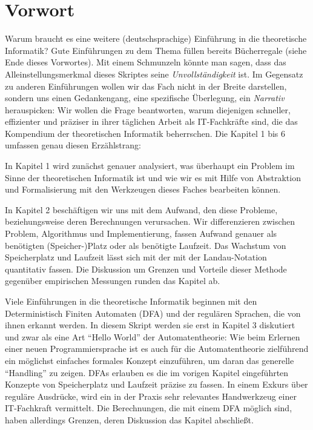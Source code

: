 \chapter{Vorwort}

Warum braucht es eine weitere (deutschsprachige) Einführung
in die theoretische Informatik?
Gute Einführungen zu dem Thema füllen bereits Bücherregale
(siehe Ende dieses Vorwortes).
Mit einem Schmunzeln könnte man sagen,
dass das Alleinstellungsmerkmal dieses Skriptes seine
\emph{Unvollständigkeit} ist.
Im Gegensatz zu anderen Einführungen wollen wir das Fach nicht in der Breite darstellen,
sondern uns einen Gedankengang, eine spezifische Überlegung,
ein \emph{Narrativ} herauspicken:
Wir wollen die Frage beantworten,
warum diejenigen
schneller, effizienter und präziser
in ihrer täglichen Arbeit als IT-Fachkräfte sind,
die das Kompendium der theoretischen Informatik beherrschen.
Die Kapitel 1 bis 6 umfassen genau diesen Erzählstrang:

In Kapitel 1 wird zunächst genauer analysiert,
was überhaupt ein Problem im Sinne der theoretischen Informatik ist
und wie wir es mit Hilfe von Abstraktion und Formalisierung mit den Werkzeugen
dieses Faches bearbeiten können.

In Kapitel 2 beschäftigen wir uns mit dem Aufwand,
den diese Probleme, beziehungsweise deren Berechnungen verursachen.
Wir differenzieren zwischen Problem, Algorithmus und Implementierung,
fassen Aufwand genauer als benötigten (Speicher-)Platz oder als benötigte Laufzeit.
Das Wachstum von Speicherplatz und Laufzeit lässt sich mit der
mit der Landau-Notation quantitativ fassen. 
Die Diskussion um Grenzen und Vorteile dieser Methode
gegenüber empirischen Messungen runden das Kapitel ab.

Viele Einführungen in die theoretische Informatik beginnen mit 
den Deterministisch Finiten Automaten (DFA) 
und der regulären Sprachen, die von ihnen erkannt werden.
In diesem Skript werden sie erst in Kapitel 3 diskutiert
und zwar als eine Art ``Hello World'' der Automatentheorie:
Wie beim Erlernen einer neuen Programmiersprache
ist es auch für die Automatentheorie zielführend
ein möglichst einfaches formales Konzept einzuführen,
um daran das generelle ``Handling'' zu zeigen. 
DFAs erlauben es die im vorigen Kapitel eingeführten
Konzepte von Speicherplatz und Laufzeit präzise zu fassen.
In einem Exkurs über reguläre Ausdrücke,
wird ein in der Praxis sehr relevantes Handwerkzeug einer IT-Fachkraft vermittelt.
Die Berechnungen, die mit einem DFA möglich sind, 
haben allerdings Grenzen, deren Diskussion das Kapitel abschließt.


